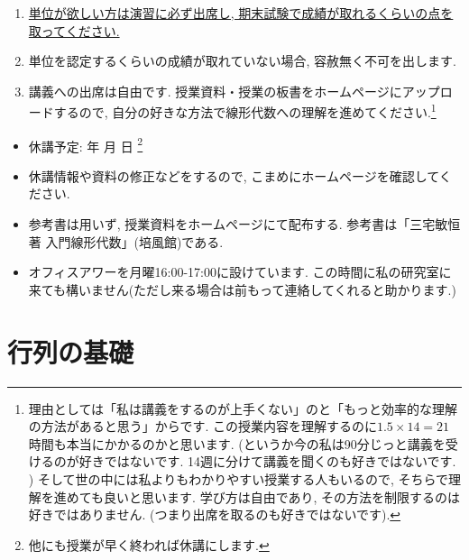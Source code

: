 \documentclass[dvipdfmx,a4paper,11pt]{article}
\theoremstyle{definition}
\begin{document}
\medskip
{}
\begin{enumerate}
  \setlength{\parskip}{0cm} 
  \setlength{\itemsep}{0cm} 
\item \underline{単位が欲しい方は演習に必ず出席し, 期末試験で成績が取れるくらいの点を取ってください.} 
\item 単位を認定するくらいの成績が取れていない場合, 容赦無く不可を出します. 
\item 講義への出席は自由です. 授業資料・授業の板書をホームページにアップロードするので, 自分の好きな方法で線形代数への理解を進めてください.\footnote{理由としては「私は講義をするのが上手くない」のと「もっと効率的な理解の方法があると思う」からです. この授業内容を理解するのに$1.5 \times 14 = 21$時間も本当にかかるのかと思います. (というか今の私は90分じっと講義を受けるのが好きではないです.  14週に分けて講義を聞くのも好きではないです. ) そして世の中には私よりもわかりやすい授業する人もいるので, そちらで理解を進めても良いと思います. 学び方は自由であり, その方法を制限するのは好きではありません. (つまり出席を取るのも好きではないです).}
\end{enumerate}


\vspace{11pt}
\begin{itemize}
  \setlength{\parskip}{0cm} %
  \setlength{\itemsep}{0cm} %
  \item 休講予定: 年 月 日 
  \footnote{他にも授業が早く終われば休講にします.} 
  \item 休講情報や資料の修正などをするので, こまめにホームページを確認してください.
  \item 参考書は用いず, 授業資料をホームページにて配布する. 参考書は「三宅敏恒著 入門線形代数」(培風館)である.
   \item オフィスアワーを月曜16:00-17:00に設けています. この時間に私の研究室に来ても構いません(ただし来る場合は前もって連絡してくれると助かります.)
 \end{itemize}


\newpage 


\section{行列の基礎}
\label{sec-1}
\end{document}

